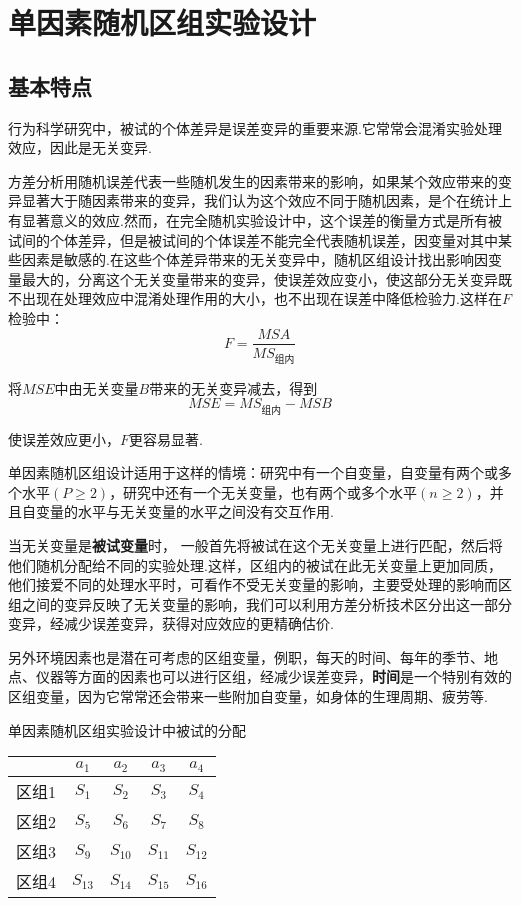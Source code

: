 \section{单因素随机区组实验设计}

\subsection{基本特点}
行为科学研究中，被试的个体差异是误差变异的重要来源.它常常会混淆实验处理效应，因此是无关变异.

方差分析用随机误差代表一些随机发生的因素带来的影响，如果某个效应带来的变异显著大于随因素带来的变异，我们认为这个效应不同于随机因素，是个在统计上有显著意义的效应.然而，在完全随机实验设计中，这个误差的衡量方式是所有被试间的个体差异，但是被试间的个体误差不能完全代表随机误差，因变量对其中某些因素是敏感的.在这些个体差异带来的无关变异中，随机区组设计找出影响因变量最大的，分离这个无关变量带来的变异，使误差效应变小，使这部分无关变异既不出现在处理效应中混淆处理作用的大小，也不出现在误差中降低检验力.这样在$F$检验中：
\[F=\frac{MSA}{MS_{\text{组内}}}\]

将$MSE$中由无关变量$B$带来的无关变异减去，得到
\[MSE=MS_{组内}-MSB\]

使误差效应更小，$F$更容易显著.

单因素随机区组设计适用于这样的情境：研究中有一个自变量，自变量有两个或多个水平$\left( P \geq 2 \right)$，研究中还有一个无关变量，也有两个或多个水平$\left( n \geq 2 \right)$，并且自变量的水平与无关变量的水平之间没有交互作用.

当无关变量是\textbf{被试变量}时， 一般首先将被试在这个无关变量上进行匹配，然后将他们随机分配给不同的实验处理.这样，区组内的被试在此无关变量上更加同质，他们接爱不同的处理水平时，可看作不受无关变量的影响，主要受处理的影响而区组之间的变异反映了无关变量的影响，我们可以利用方差分析技术区分出这一部分变异，经减少误差变异，获得对应效应的更精确估价.

另外环境因素也是潜在可考虑的区组变量，例职，每天的时间、每年的季节、地点、仪器等方面的因素也可以进行区组，经减少误差变异，\textbf{时间}是一个特别有效的区组变量，因为它常常还会带来一些附加自变量，如身体的生理周期、疲劳等.



\begin{margintable}
	\centering
	\caption{单因素随机区组实验设计中被试的分配}
	{
			\begin{tabular}{ccccc}
			\toprule
			 & $a_1$ & $a_2$ & $a_3$ & $a_4$ \\
			\midrule
			区组1 & $S_1$ & $S_2$ & $S_3$ & $S_4$ \\
			区组2 & $S_5$ & $S_6$ & $S_7$ & $S_8$ \\
			区组3 & $S_9$ & $S_{10}$ & $S_{11}$ & $S_{12}$ \\
			区组4 & $S_{13}$ & $S_{14}$ & $S_{15}$ & $S_{16}$ \\
			\bottomrule
		\end{tabular}	
	}
\end{margintable}

